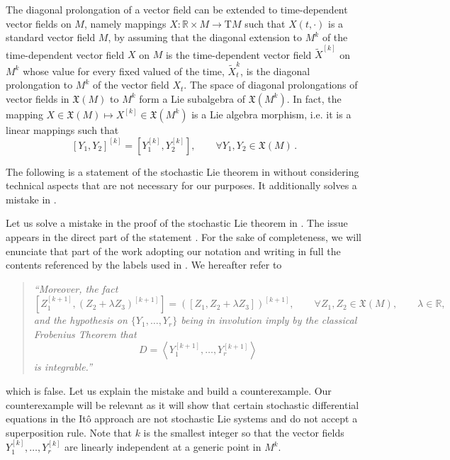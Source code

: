 \documentclass[11pt]{article}
\theoremstyle{plain}
\theoremstyle{definition}
\newcommand{\T}{\mathrm{T}}
\newcommand{\X}{\mathfrak{X}}
\begin{document}
The diagonal prolongation of a vector field can be extended to time-dependent vector fields on $M$, namely mappings $X:\mathbb{R}\times M\rightarrow \T M$ such that $X(t,\cdot)$ is a standard vector field $M$, by assuming that the diagonal extension to $M^k$ of the time-dependent vector field $X$ on $M$ is the time-dependent vector field $\widetilde{X}^{[k]}$ on $M^k$ whose value for every fixed valued of the time, $\widetilde{X}^k_t$, is the diagonal prolongation to $M^k$ of the vector field $X_t$. The space of diagonal prolongations of vector fields in $\mathfrak{X} (M)$ to $M^k$ form a Lie subalgebra of $\mathfrak{X}
(M^k)$. In fact, the mapping $X\in \X(M)\mapsto {X}^{[k]}\in \X(M^{k})$ is a Lie algebra morphism, i.e. it is a linear mappings such that
\begin{equation}
  \label{eq 14} [Y_1,Y_2]^{[k]}=\left[{Y}^{[k]}_1, {Y}^{[k]}_2\right],\qquad \forall Y_1,Y_2\in \mathfrak{X}(M)\,.
  \end{equation}

The following is a statement of the stochastic Lie theorem in \cite{LO09} without considering technical aspects that are not necessary for our purposes. It additionally solves a mistake in \cite{LO09}.

Let us solve a mistake in the proof of the stochastic Lie theorem in \cite{LO09}. The issue appears in the direct part of the statement \cite[p. 215, Theorem 3.1]{LO09}. For the sake of completeness, we will enunciate that part of the work adopting our notation and writing in full the contents referenced by the labels used in \cite{LO09}. We hereafter refer to
\begin{quote}\it
    ``Moreover, the fact
    $$
    \left[ {Z}^{[k+1]}_1,(Z_2+\lambda Z_3)^{[k+1]}\right]=([Z_1,Z_2+\lambda Z_3])^{[k+1]},\qquad \forall Z_1,Z_2\in \mathfrak{X}(M),\qquad \lambda\in \mathbb{R},
    $$
    and the hypothesis on $\{Y_1,\dotsc, Y_r\}$
    being in involution imply by the classical Frobenius Theorem that 
    $$
    D=\left\langle {Y}^{[k+1]}_1,\ldots,{Y}^{[k+1]}_r\right\rangle
    $$
    is integrable.''
\end{quote}
which is false. Let us explain the mistake and build a counterexample. Our counterexample will be relevant as it will show that certain stochastic differential equations in the It\^{o} approach are not stochastic Lie systems and do not accept a superposition rule. Note that $k$ is the smallest integer so that the vector fields $ {Y}^{[k]}_1,\ldots, {Y}^{[k]}_r$ are linearly independent at a generic point in $M^k$.
\end{document}
